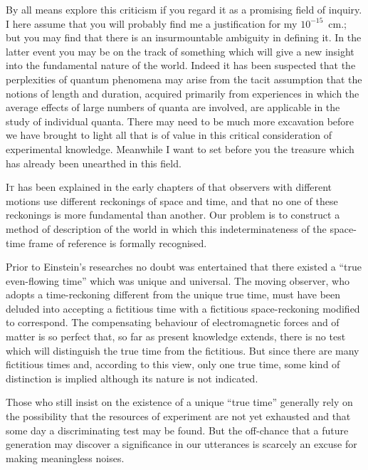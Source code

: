 \documentclass[12pt]{book}
\begin{document}
By all means explore this criticism if you regard it as a promising field
of inquiry. I here assume that you will probably find me a justification for
my $10^{-15}$~cm.; but you may find that there is an insurmountable ambiguity
in defining it. In the latter event you may be on the track of something
which will give a new insight into the fundamental nature of the world.
Indeed it has been suspected that the perplexities of quantum phenomena
may arise from the tacit assumption that the notions of length and duration,
acquired primarily from experiences in which the average effects of large
numbers of quanta are involved, are applicable in the study of individual
quanta. There may need to be much more excavation before we have brought
to light all that is of value in this critical consideration of experimental
knowledge. Meanwhile I want to set before you the treasure which has
already been unearthed in this field.



\lettrine{\textcolor{lettrinecolour}{I}}{t} has been explained in the early chapters of
 that observers with different motions use different
reckonings of space and time, and that no one of these reckonings is more fundamental than another.
Our problem is to construct a method of description of the world in which
this indeterminateness of the space-time frame of reference is formally recognised.

Prior to Einstein's researches no doubt was entertained that there existed
a ``true even\hyp{}flowing time'' which was unique and universal. The moving
observer, who adopts a time\hyp{}reckoning different from the unique true time,
must have been deluded into accepting a fictitious time with a fictitious
space\hyp{}reckoning modified to correspond. The compensating behaviour of
electromagnetic forces and of matter is so perfect that, so far as present
knowledge extends, there is no test which will distinguish the true time from
the fictitious. But since there are many fictitious times and, according to
this view, only one true time, some kind of distinction is implied although its
nature is not indicated.

Those who still insist on the existence of a unique ``true time'' generally
rely on the possibility that the resources of experiment are not yet exhausted
and that some day a discriminating test may be found. But the off-chance
that a future generation may discover a significance in our utterances is
scarcely an excuse for making meaningless noises.
\end{document}
